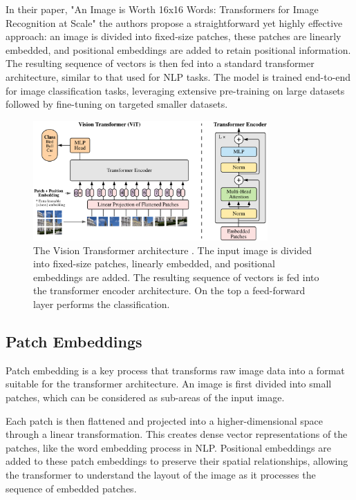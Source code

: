 In their paper, "An Image is Worth 16x16 Words: Transformers for 
Image Recognition at Scale" \cite{vit} the authors propose a straightforward yet 
highly 
effective approach: an image is divided into fixed-size patches, these patches 
are linearly embedded, and positional embeddings are added to retain positional 
information. The resulting sequence of vectors is then fed into a standard 
transformer architecture, similar to that used for NLP tasks. The model is 
trained end-to-end for image classification tasks, leveraging extensive 
pre-training on large datasets followed by fine-tuning on targeted smaller 
datasets.

\begin{figure}
    \centering
    \includegraphics[width=0.8\textwidth]{images/vit/vit_scheme.png}
    \vspace*{0.3cm}
    \caption[The Vision Transformer architecture.]
    {The Vision Transformer architecture \cite{vit}. The input image is divided 
    into fixed-size patches, linearly embedded, and positional embeddings are 
    added. The resulting sequence of vectors is fed into the transformer encoder 
    architecture. On the top a feed-forward layer performs the classification.}
    \label{fig:vit_architecture}
\end{figure}

\subsection{Patch Embeddings}
Patch embedding is a key process that transforms raw image data into a format 
suitable for the transformer architecture. An image is first divided into small 
patches, which can be considered as sub-areas of the input image. 

Each patch is then flattened and projected into a higher-dimensional space 
through a linear transformation. This creates dense vector representations of 
the patches, like the word embedding process in NLP. 
Positional embeddings are added to these patch embeddings to preserve their 
spatial relationships, allowing the transformer to understand the layout of the 
image as it processes the sequence of embedded patches. 

